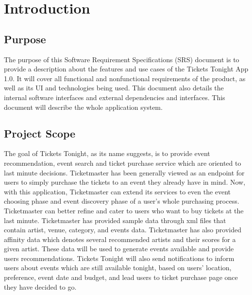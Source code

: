 \section{Introduction }
	\subsection{Purpose}
      The purpose of this Software Requirement Specifications (SRS) document is to provide a description about 
      the features and use cases of the Tickets Tonight App 1.0. It will cover all functional and nonfunctional 
      requirements of the product, as well as its UI and technologies being used. This document also details 
      the internal software interfaces and external dependencies and interfaces. This document will describe 
      the whole application system. 
	\subsection{Project Scope}
	  The goal of Tickets Tonight, as its name suggests, is to provide event recommendation, event search and 
	  ticket purchase service which are oriented to last minute decisions. Ticketmaster has been generally 
	  viewed as an endpoint for users to simply purchase the tickets to an event they already have in mind. 
	  Now, with this application, Ticketmaster can extend its services to even the event choosing phase and 
	  event discovery phase of a user’s whole purchasing process. Ticketmaster can better refine and cater to 
	  users who want to buy tickets at the last minute. Ticketmaster has provided sample data through xml 
	  files that contain artist, venue, category, and events data. Ticketmaster has also provided affinity data 
	  which denotes several recommended artists and their scores for a given artist. These data will be used to 
	  generate events available and provide users recommendations. Tickets Tonight will also send 
	  notifications to inform users about events which are still available tonight, based on users’ location, 
	  preference, event date and budget, and lead users to ticket purchase page once they have decided to go.
